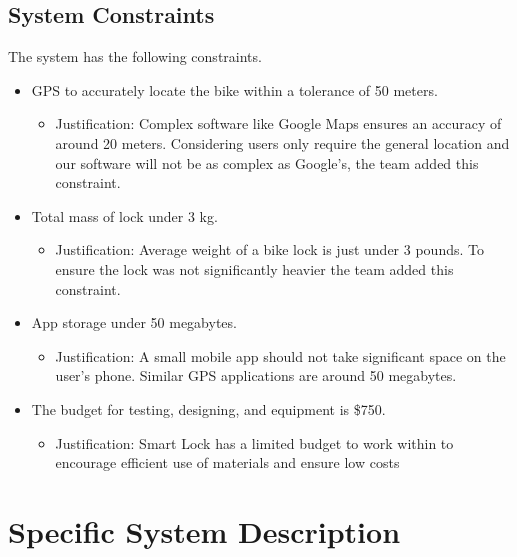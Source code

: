 \documentclass[12pt]{article}
\begin{document}
\subsection{System Constraints}

The system has the following constraints.

\begin{itemize}

\item GPS to accurately locate the bike within a tolerance of 50 meters.
	\begin{itemize}
		\item Justification: Complex software like Google Maps ensures an accuracy of around 20 meters. Considering users only 		require the general location and our software will not be as complex as Google’s, the team added this constraint. 
	\end{itemize}

\item Total mass of lock under 3 kg. 
	\begin{itemize} 
		\item Justification: Average weight of a bike lock is just under 3 pounds. To ensure the lock was not significantly 				heavier the team added this constraint.
	\end{itemize}

\item App storage under 50 megabytes. 
	\begin{itemize} 
		\item Justification: A small mobile app should not take significant space on the user's phone. Similar GPS applications 			are around 50 megabytes.
	\end{itemize}

\item The budget for testing, designing, and equipment is \$750.
	\begin{itemize}
		\item Justification: Smart Lock has a limited budget to work within to encourage efficient use of materials and ensure low 			costs
	\end{itemize} 

\end{itemize}

\section{Specific System Description}
\end{document}
